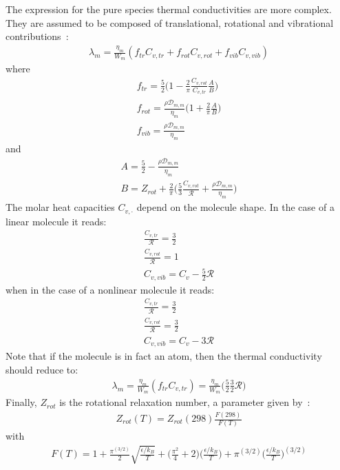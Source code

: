 The expression for the pure species thermal conductivities are more complex. They are assumed to be composed of translational, rotational and vibrational contributions~\cite{Warnatz:}:
\begin{eqnarray}
\lambda_m = \frac{\eta_m}{W_m} (f_{tr}C_{v,tr} + f_{rot}C_{v,rot} + f_{vib}C_{v,vib})
\end{eqnarray}
where
\begin{eqnarray}
f_{tr} = \frac{5}{2}\Big(1-\frac{2}{\pi} \frac{C_{v,rot}}{C_{v,tr}} \frac{A}{B} \Big)
\\
 f_{rot} = \frac{\rho \mathcal{D}_{m,m}}{\eta_m} \Big( 1 + \frac{2}{\pi} \frac{A}{B}  \Big)
 \\
 f_{vib} = \frac{\rho \mathcal{D}_{m,m}}{\eta_m}
\end{eqnarray}
and
\begin{eqnarray}
A = \frac{5}{2} - \frac{\rho \mathcal{D}_{m,m}}{\eta_m}
\\
B = Z_{rot} + \frac{2}{\pi} \Big( \frac{5}{3} \frac{C_{v,rot}}{\mathcal{R}} + \frac{\rho \mathcal{D}_{m,m}}{\eta_m} \Big)
\end{eqnarray}
The molar heat capacities $C_{v,\cdot}$ depend on the molecule shape. In the case of a linear molecule it reads:
\begin{eqnarray}
\frac{C_{v,tr}}{\mathcal{R}} = \frac{3}{2}
\\
\frac{C_{v,rot}}{\mathcal{R}} = 1
\\
{C_{v,vib}} = C_v - \frac{5}{2} \mathcal{R}
\end{eqnarray}
when in the case of a nonlinear molecule it reads:
\begin{eqnarray}
\frac{C_{v,tr}}{\mathcal{R}} = \frac{3}{2}
\\
\frac{C_{v,rot}}{\mathcal{R}} =  \frac{3}{2}
\\
{C_{v,vib}} = C_v - 3 \mathcal{R}
\end{eqnarray}
Note that if the molecule is in fact an atom, then the thermal conductivity should reduce to:
\begin{eqnarray}
\lambda_m = \frac{\eta_m}{W_m} (f_{tr}C_{v,tr} ) = \frac{\eta_m}{W_m} \Big(\frac{5}{2}  \frac{3}{2} \mathcal{R}\Big) 
\end{eqnarray}
Finally, $Z_{rot}$ is the rotational relaxation number, a parameter given by~\cite{Parker:}:
\begin{eqnarray}
Z_{rot}(T) = Z_{rot} (298) \frac{F(298)}{F(T)}
\end{eqnarray}
with 
\begin{eqnarray}
F(T) = 1 + \frac{\pi^{(3/2)}}{2} \sqrt{\frac{\epsilon/k_B}{T} } + \Big( \frac{\pi^2}{4} +2 \Big) \Big( \frac{\epsilon/k_B}{T} \Big) + \pi^{(3/2)}\Big( \frac{\epsilon/k_B}{T} \Big)^{(3/2)} 
\end{eqnarray}

